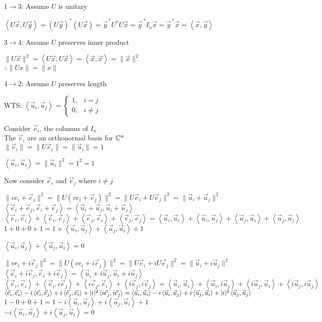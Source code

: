 \documentclass[letterpaper,12pt,fleqn]{article}
\newcommand{\inner}[2]{\left<#1,#2\right>}
\newcommand{\vx}{\vec{x}}
\newcommand{\vy}{\vec{y}}
\newcommand{\vu}{\vec{u}}
\newcommand{\ve}{\vec{e}}
\begin{document}
\begin{theproof}
  \listbreak
  \begin{description}
  \item $1\to 3$: Assume $U$ is unitary
    
    $\inner{U\vx}{U\vy}=(U\vy)^*(U\vx)=\vy^{\,*}U^*U\vx=\vy^{\,*}I_n\vx=
    \vy^{\,*}\vx=\inner{\vx}{\vy}$

  \item $3\to 4$: Assume $U$ preserves inner product

    $\|U\vx\|^2=\inner{U\vx}{U\vx}=\inner{\vx}{\vx}=\|\vx\|^2$ \\
    $\therefore\|Ux\|=\|x\|$

  \item $4\to 2$: Assume $U$ preserves length

    WTS: $\inner{\vu_i}{\vu_j}=
    \begin{cases} 1, & i=j \\ 0, & i\ne j\end{cases}$

    Consider $\ve_i$, the columns of $I_n$ \\
    The $\ve_i$ are an orthonormal basis for $\mathbb{C}^n$ \\
    $\|\ve_i\|=\|U\ve_i\|=\|\vu_i\|=1$
    
    $\inner{\vu_i}{\vu_i}=\|\vu_i\|^2=1^2=1$

    Now consider $\ve_i$ and $\ve_j$ where $i\ne j$

    $\|ve_i+\ve_j\|^2=\|U(ve_i+\ve_j)\|^2=\|U\ve_i+U\ve_j\|^2=
    \|\vu_i+\vu_j\|^2$ \\
    $\inner{\ve_i+\ve_j}{\ve_i+\ve_j}=\inner{\vu_i+\vu_j}{\vu_i+\vu_j}$ \\
    $\inner{\ve_i}{\ve_i}+\inner{\ve_i}{\ve_j}+\inner{\ve_j}{\ve_i}+
    \inner{\ve_j}{\ve_j}=
    \inner{\vu_i}{\vu_i}+\inner{\vu_i}{\vu_j}+\inner{\vu_j}{\vu_i}+
    \inner{\vu_j}{\vu_j}$ \\
    $1+0+0+1=1+\inner{\vu_i}{\vu_j}+\inner{\vu_j}{\vu_i}+1$

    $\inner{\vu_i}{\vu_j}+\inner{\vu_j}{\vu_i}=0$

    $\|ve_i+i\ve_j\|^2=\|U(ve_i+i\ve_j)\|^2=\|U\ve_i+iU\ve_j\|^2=
    \|\vu_i+i\vu_j\|^2$ \\
    $\inner{\ve_i+i\ve_j}{\ve_i+i\ve_j}=
    \inner{\vu_i+i\vu_j}{\vu_i+i\vu_j}$ \\
    $\inner{\ve_i}{\ve_i}+\inner{\ve_i}{i\ve_j}+\inner{i\ve_j}{\ve_i}+
    \inner{i\ve_j}{i\ve_j}=
    \inner{\vu_i}{\vu_i}+\inner{\vu_i}{i\vu_j}+\inner{i\vu_j}{\vu_i}+
    \inner{i\vu_j}{i\vu_j}$ \\
    $\inner{\ve_i}{\ve_i}-i\inner{\ve_i}{\ve_j}+i\inner{\ve_j}{\ve_i}+
    \abs{i}^2\inner{i\ve_j}{i\ve_j}=
    \inner{\vu_i}{\vu_i}-i\inner{\vu_i}{\vu_j}+i\inner{\vu_j}{\vu_i}+
    \abs{i}^2\inner{\vu_j}{\vu_j}$ \\
    $1-0+0+1=1-i\inner{\vu_i}{\vu_j}+i\inner{\vu_j}{\vu_i}+1$ \\
    $-i\inner{\vu_i}{\vu_j}+i\inner{\vu_j}{\vu_i}=0$


\end{description}
\end{theproof}
\end{document}
